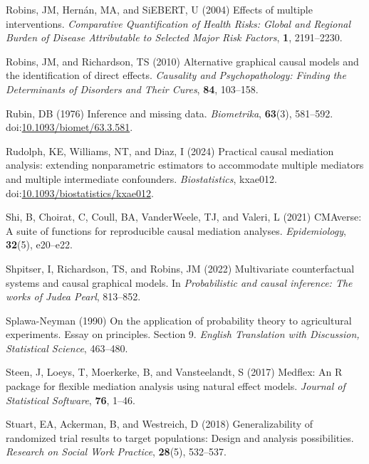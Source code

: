 \documentclass[
  single column]{article}
\newlength{\cslhangindent}
\newenvironment{CSLReferences}[2] %
 {\begin{list}{}{%
  \setlength{\itemindent}{0pt}
  \setlength{\leftmargin}{0pt}
  \setlength{\parsep}{0pt}
  \ifodd #1
   \setlength{\leftmargin}{\cslhangindent}
   \setlength{\itemindent}{-1\cslhangindent}
  \fi
  \setlength{\itemsep}{#2\baselineskip}}}
 {\end{list}}
\begin{document}
\begin{CSLReferences}{1}{0}
Robins, JM, Hernán, MA, and SiEBERT, U (2004) Effects of multiple
interventions. \emph{Comparative Quantification of Health Risks: Global
and Regional Burden of Disease Attributable to Selected Major Risk
Factors}, \textbf{1}, 2191--2230.

Robins, JM, and Richardson, TS (2010) Alternative graphical causal
models and the identification of direct effects. \emph{Causality and
Psychopathology: Finding the Determinants of Disorders and Their Cures},
\textbf{84}, 103--158.

Rubin, DB (1976) Inference and missing data. \emph{Biometrika},
\textbf{63}(3), 581--592.
doi:\href{https://doi.org/10.1093/biomet/63.3.581}{10.1093/biomet/63.3.581}.

Rudolph, KE, Williams, NT, and Diaz, I (2024) {Practical causal
mediation analysis: extending nonparametric estimators to accommodate
multiple mediators and multiple intermediate confounders}.
\emph{Biostatistics}, kxae012.
doi:\href{https://doi.org/10.1093/biostatistics/kxae012}{10.1093/biostatistics/kxae012}.

Shi, B, Choirat, C, Coull, BA, VanderWeele, TJ, and Valeri, L (2021)
CMAverse: A suite of functions for reproducible causal mediation
analyses. \emph{Epidemiology}, \textbf{32}(5), e20--e22.

Shpitser, I, Richardson, TS, and Robins, JM (2022) Multivariate
counterfactual systems and causal graphical models. In
\emph{Probabilistic and causal inference: The works of {J}udea {P}earl},
813--852.

Splawa-Neyman (1990) On the application of probability theory to
agricultural experiments. Essay on principles. Section 9. \emph{English
Translation with Discussion, Statistical Science}, 463--480.

Steen, J, Loeys, T, Moerkerke, B, and Vansteelandt, S (2017) Medflex: An
{R} package for flexible mediation analysis using natural effect models.
\emph{Journal of Statistical Software}, \textbf{76}, 1--46.

Stuart, EA, Ackerman, B, and Westreich, D (2018) Generalizability of
randomized trial results to target populations: Design and analysis
possibilities. \emph{Research on Social Work Practice}, \textbf{28}(5),
532--537.


\end{CSLReferences}
\end{document}

